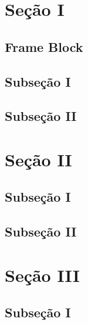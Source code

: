\documentclass[aspectratio=169]{beamer}
\begin{document}
\newcommand{\github}{github.com/physikices}
\newcommand{\email}{rodrigo.nascimento@edu.udesc.br}
\newcommand{\website}{}
\capa

\section{Seção I}
\subsection{Frame Block}
\subsection{Subseção I}
\subsection{Subseção II}

\section{Seção II}
\subsection{Subseção I}
\subsection{Subseção II}

\section{Seção III}
\subsection{Subseção I}
\end{document}
